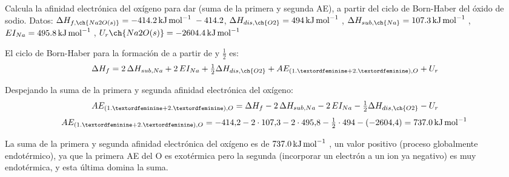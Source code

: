 \begin{exercise}
    Calcula la afinidad electrónica del oxígeno para dar  (suma de la primera y segunda AE), a partir del ciclo de Born-Haber del óxido de sodio. Datos: $\entalpia{f, \ch{Na2O (s)}} = \energia[kjmol]{-414,2} -414.2$, $\entalpia{dis,\ch{O2}} = \energia[kjmol]{494}$, $\entalpia{sub, \ch{Na}} = \energia[kjmol]{107,3}$, $EI_{Na} = \energia[kjmol]{495,8}$, $U_r{\ch{Na2O(s)}} = \energia[kjmol]{-2604,4}$
    \begin{solu}


        El ciclo de Born-Haber para la formación de  a partir de  y \(\frac{1}{2}\) es:
        \[
            \entalpia{f} = 2\,\entalpia{sub, Na} + 2\,EI_{Na} + \tfrac{1}{2}\entalpia{dis, \ch{O2}} + AE_{(1.ª+2.ª), O} + U_r
        \]

        Despejando la suma de la primera y segunda afinidad electrónica del oxígeno:
        \[
            AE_{(1.ª+2.ª), O} = \entalpia{f} - 2\,\entalpia{sub, Na} - 2\,EI_{Na} - \tfrac{1}{2}\entalpia{dis, \ch{O2}} - U_r
        \]
        \[
            AE_{(1.ª+2.ª), O} = -414{,}2 - 2\cdot107{,}3 - 2\cdot495{,}8 - \tfrac{1}{2}\cdot494 - (-2604{,}4) = \energia[kjmol]{737,0}
        \]

        La suma de la primera y segunda afinidad electrónica del oxígeno es de \(\energia[kjmol]{737,0}\), un valor positivo (proceso globalmente endotérmico), ya que la primera AE del O es exotérmica pero la segunda (incorporar un electrón a un ion  ya negativo) es muy endotérmica, y esta última domina la suma.
    \end{solu}
\end{exercise}



